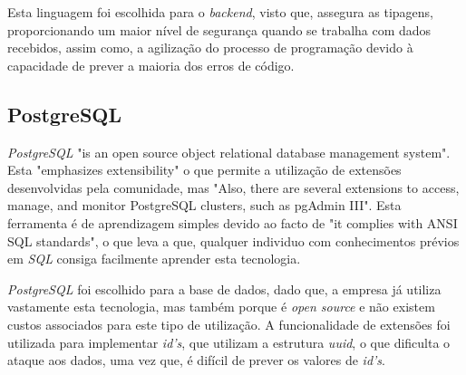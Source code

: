Esta linguagem foi escolhida para o \textit{backend}, visto que, assegura as tipagens, proporcionando um maior nível de segurança quando se trabalha com dados recebidos, assim como, a agilização do processo de programação devido à capacidade de prever a maioria dos erros de código.

\subsection{PostgreSQL}
\emph{PostgreSQL} "is an open source object relational database management system"\citep{Juba2015}. Esta "emphasizes extensibility"\citep{Juba2015} o que permite a utilização de extensões desenvolvidas pela comunidade, mas "Also, there are several extensions to access, manage, and monitor PostgreSQL clusters, such as pgAdmin III"\citep{Juba2015}. Esta ferramenta é de aprendizagem simples devido ao facto de "it complies with ANSI SQL standards"\citep{Juba2015}, o que leva a que, qualquer individuo com conhecimentos prévios em \emph{SQL} consiga facilmente aprender esta tecnologia.

\emph{PostgreSQL} foi escolhido para a base de dados, dado que, a empresa já utiliza vastamente esta tecnologia, mas também porque é \emph{open source} e não existem custos associados para este tipo de utilização. A funcionalidade de extensões foi utilizada para implementar \emph{id's}, que utilizam a estrutura \emph{uuid}, o que dificulta o ataque aos dados, uma vez que, é difícil de prever os valores de \emph{id's}.







\newpage



\newpage



